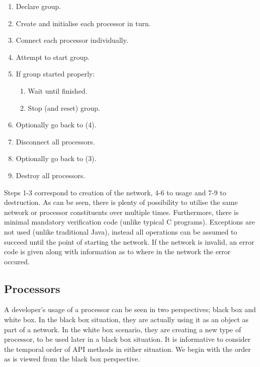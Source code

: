 \begin{enumerate}
\item Declare group.
\item Create and initialise each processor in turn.
\item Connect each processor individually.
\item Attempt to start group.
\item If group started properly:
\begin{enumerate}
	\item Wait until finished.
	\item Stop (and reset) group.
\end{enumerate}
\item Optionally go back to (4).
\item Disconnect all processors.
\item Optionally go back to (3).
\item Destroy all processors.
\end{enumerate}

Steps 1-3 correspond to creation of the network, 4-6 to usage and 7-9 to destruction. As can be seen, there is plenty of possibility to utilise the same network or processor constituents over multiple times. Furthermore, there is minimal mandatory verification code (unlike typical C programs). Exceptions are not used (unlike traditional Java), instead all operations can be assumed to succeed until the point of starting the network. If the network is invalid, an error code is given along with information as to where in the network the error occured.

\subsection{Processors}\label{sec:processors}

A developer's usage of a processor can be seen in two perspectives; black box and white box. In the black box situation, they are actually using it as an object as part of a network. In the white box scenario, they are creating a new type of processor, to be used later in a black box situation. It is informative to consider the temporal order of API methods in either situation. We begin with the order as is viewed from the black box perspective.

